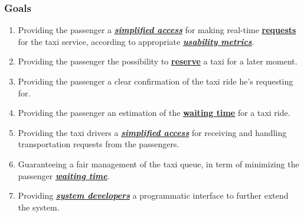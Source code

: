 \documentclass[11pt, a4paper,titlepage]{article}
\newcommand{\link}[2]{\underline{\textbf{\hyperref[#1]{#2}}}}
\begin{document}
\subsubsection{Goals}
	\begin{enumerate}
	\item \label{itm:Goal_PassengerInterface} Providing the passenger a \textit{\link{itm:Desc_SimplifiedAccess}{simplified access}} for making real-time \link{itm:Desc_Request}{requests} for the taxi service, according to appropriate \textit{\link{itm:Desc_UsabilityMetric}{usability metrics}}.
	\item \label{itm:Goal_Reservation} Providing the passenger the possibility to \link{itm:Desc_Reservation}{reserve} a taxi for a later moment.
	\item \label{itm:Goal_Confirmation} Providing the passenger a clear confirmation of the taxi ride he’s requesting for.
	\item \label{itm:Goal_WaitingTime} Providing the passenger an estimation of the \link{itm:Desc_WaitingTime}{waiting time} for a taxi ride.
	\item \label{itm:Goal_TaxiInterface} Providing the taxi drivers a \textit{\link{itm:Desc_SimplifiedAccess}{simplified access}} for receiving and handling transportation requests from the passengers.
	\item \label{itm:Goal_FairManagement} Guaranteeing a fair management of the taxi queue, in term of minimizing the passenger \textit{\link{itm:Desc_WaitingTime}{waiting time}}.
	\item \label{itm:Goal_DeveloperInterface} Providing \textit{\link{itm:Actor_SysDevs}{system developers}}  a programmatic interface to further extend the system.
		\end{enumerate}
\end{document}
